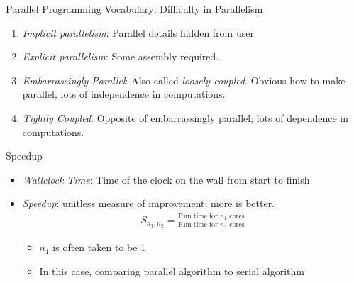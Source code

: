 

\begin{frame}
  \begin{block}{Parallel Programming Vocabulary:  Difficulty in Parallelism}
  \begin{enumerate}[<+-|alert@+>]
    \item \emph{Implicit parallelism}:  Parallel details hidden from user
    \item \emph{Explicit parallelism}:  Some assembly required\dots
    \item \emph{Embarrassingly Parallel}:  Also called \emph{loosely coupled}.  Obvious how to make parallel; lots of independence in computations.
    \item \emph{Tightly Coupled}:  Opposite of embarrassingly parallel; lots of dependence in computations.
  \end{enumerate}  
  \end{block}
\end{frame}


\begin{frame}
  \begin{block}{Speedup}
  \begin{itemize}
    \item \emph{Wallclock Time}:  Time of the clock on the wall from start to finish
    \item \emph{Speedup}:  unitless measure of improvement; more is better.
  \begin{align*}
   S_{n_1, n_2} =  \frac{\text{Run time for } n_1 \text{ cores}}{\text{Run time for } n_2 \text{ cores}}
  \end{align*}
  \begin{itemize}
    \item   $n_1$ is often taken to be 1
    \item In this case, comparing parallel algorithm to serial algorithm
  \end{itemize}
  \end{itemize}
  \end{block}
\end{frame}


